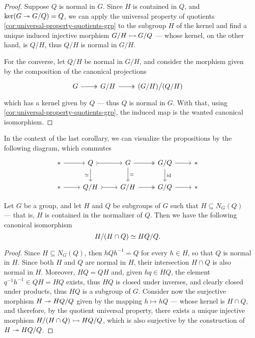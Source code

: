 \begin{proof}
Suppose \(Q\) is normal in \(G\). Since \(H\) is contained in \(Q\), and \(\ker(G
\twoheadrightarrow G/Q) = Q\), we can apply the universal property of quotients
\cref{cor:universal-property-quotients-grp} to the subgroup \(H\) of the kernel
and find a unique induced injective morphism \(G/H \rightarrowtail G/Q\) --- whose kernel,
on the other hand, is \(Q/H\), thus \(Q/H\) is normal in \(G/H\).

For the converse, let \(Q/H\) be normal in \(G/H\), and consider the morphism
given by the composition of the canonical projections
\[
  \begin{tikzcd}
    G \ar[r, two heads] &G/H \ar[r, two heads] &(G/H) \big/ (Q/H)
  \end{tikzcd}
\]
which has a kernel given by \(Q\) --- thus \(Q\) is normal in \(G\). With that,
using \cref{cor:universal-property-quotients-grp}, the induced map is the wanted
canonical isomorphism.
\end{proof}

In the context of the last corollary, we can visualize the propositions by the
following diagram, which commutes
\[
  \begin{tikzcd}
    * \ar[r] &Q \ar[r, tail] \ar[d, "\iso"'] &G \ar[r, two heads] \ar[d, "\iso"]
    &G/Q \ar[r] \ar[d, "\Id"] &*
    \\
    * \ar[r] &Q/H \ar[r, tail] &G/H \ar[r, two heads] &G/Q \ar[r] &*
  \end{tikzcd}
\]

\begin{corollary}
\label{cor:grp-intersection-coset-isomorphism}
Let \(G\) be a group, and let \(H\) and \(Q\) be subgroups of \(G\) such that
\(H \subseteq N_G(Q)\) --- that is, \(H\) is contained in the normalizer of
\(Q\). Then we have the following canonical isomorphism
\[
  H/(H \cap Q) \simeq H Q / Q.
\]
\end{corollary}

\begin{proof}
Since \(H \subseteq N_G(Q)\), then \(hQh^{-1} = Q\) for every \(h \in H\), so
that \(Q\) is normal in \(H\). Since both \(H\) and \(Q\) are normal in \(H\),
their intersection \(H \cap Q\) is also normal in \(H\). Moreover, \(HQ = QH\)
and, given \(hq \in HQ\), the element \(q^{-1} h^{-1} \in Q H = H Q\) exists, thus
\(HQ\) is closed under inverses, and clearly closed under products, thus \(HQ\)
is a subgroup of \(G\). Consider now the surjective morphism \(H \twoheadrightarrow H Q / Q\)
given by the mapping \(h \mapsto h Q\) --- whose kernel is \(H \cap Q\), and
therefore, by the quotient universal property, there exists a unique injective
morphism \(H/(H \cap Q) \rightarrowtail HQ/Q\), which is also surjective by the
construction of \(H \twoheadrightarrow H Q / Q\).
\end{proof}

